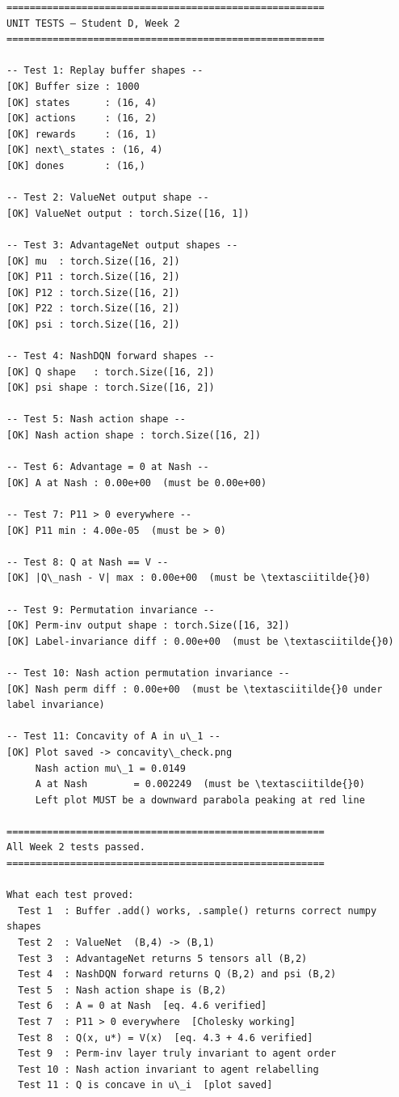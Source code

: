 \documentclass[11pt]{article}
\begin{document}
    \begin{Verbatim}[commandchars=\\\{\}]
=======================================================
UNIT TESTS — Student D, Week 2
=======================================================

-- Test 1: Replay buffer shapes --
[OK] Buffer size : 1000
[OK] states      : (16, 4)
[OK] actions     : (16, 2)
[OK] rewards     : (16, 1)
[OK] next\_states : (16, 4)
[OK] dones       : (16,)

-- Test 2: ValueNet output shape --
[OK] ValueNet output : torch.Size([16, 1])

-- Test 3: AdvantageNet output shapes --
[OK] mu  : torch.Size([16, 2])
[OK] P11 : torch.Size([16, 2])
[OK] P12 : torch.Size([16, 2])
[OK] P22 : torch.Size([16, 2])
[OK] psi : torch.Size([16, 2])

-- Test 4: NashDQN forward shapes --
[OK] Q shape   : torch.Size([16, 2])
[OK] psi shape : torch.Size([16, 2])

-- Test 5: Nash action shape --
[OK] Nash action shape : torch.Size([16, 2])

-- Test 6: Advantage = 0 at Nash --
[OK] A at Nash : 0.00e+00  (must be 0.00e+00)

-- Test 7: P11 > 0 everywhere --
[OK] P11 min : 4.00e-05  (must be > 0)

-- Test 8: Q at Nash == V --
[OK] |Q\_nash - V| max : 0.00e+00  (must be \textasciitilde{}0)

-- Test 9: Permutation invariance --
[OK] Perm-inv output shape : torch.Size([16, 32])
[OK] Label-invariance diff : 0.00e+00  (must be \textasciitilde{}0)

-- Test 10: Nash action permutation invariance --
[OK] Nash perm diff : 0.00e+00  (must be \textasciitilde{}0 under label invariance)

-- Test 11: Concavity of A in u\_1 --
[OK] Plot saved -> concavity\_check.png
     Nash action mu\_1 = 0.0149
     A at Nash        = 0.002249  (must be \textasciitilde{}0)
     Left plot MUST be a downward parabola peaking at red line

=======================================================
All Week 2 tests passed.
=======================================================

What each test proved:
  Test 1  : Buffer .add() works, .sample() returns correct numpy shapes
  Test 2  : ValueNet  (B,4) -> (B,1)
  Test 3  : AdvantageNet returns 5 tensors all (B,2)
  Test 4  : NashDQN forward returns Q (B,2) and psi (B,2)
  Test 5  : Nash action shape is (B,2)
  Test 6  : A = 0 at Nash  [eq. 4.6 verified]
  Test 7  : P11 > 0 everywhere  [Cholesky working]
  Test 8  : Q(x, u*) = V(x)  [eq. 4.3 + 4.6 verified]
  Test 9  : Perm-inv layer truly invariant to agent order
  Test 10 : Nash action invariant to agent relabelling
  Test 11 : Q is concave in u\_i  [plot saved]

    \end{Verbatim}
\end{document}
